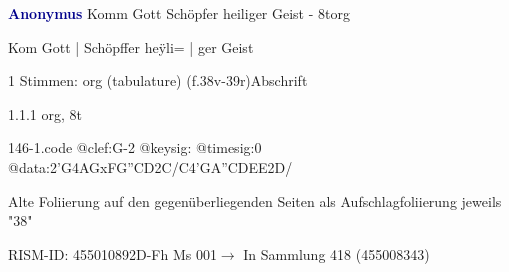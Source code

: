 \documentclass[twocolumn, 12pt]{book}
\begin{document}
\par \vspace{16pt} \textcolor{darkblue}{\textbf{Anonymus  }}\hfillplus{\textbf{[146]}}\newline Komm Gott Schöpfer heiliger Geist - 8t\newline org
\par \begin{itshape}[f.38v, at left:] Kom Gott | Schöpffer heÿli= | ger Geist\end{itshape} 
\par \textcolor{darkblue}{}  1 Stimmen: org (tabulature)  (f.38v-39r)\newline Abschrift
\par 1.1.1  org, 8t  
\begin{filecontents*}{146-1.code}
@clef:G-2
@keysig:
@timesig:0
@data:2'G4AGxFG''CD2C/C4'GA''CDEE2D/
\end{filecontents*}
\newline %
\par Alte Foliierung auf den gegenüberliegenden Seiten als Aufschlagfoliierung jeweils "38"
\par RISM-ID: 455010892\newline D-Fh  Ms 001\newline $\rightarrow$ In Sammlung 418 (455008343)
      
\end{document}

